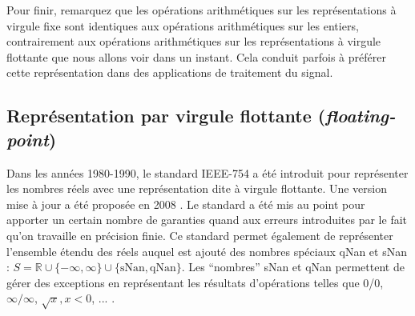 Pour finir, remarquez que les opérations arithmétiques sur les représentations à virgule fixe sont identiques aux opérations arithmétiques sur les entiers, contrairement aux opérations arithmétiques sur les représentations à virgule flottante que nous allons voir dans un instant. Cela conduit parfois à préférer cette représentation dans des applications de traitement du signal.


\subsection{Représentation par virgule flottante (\emph{floating-point})}

Dans les années 1980-1990, le standard IEEE-754 a été introduit pour représenter les nombres réels avec une représentation dite à virgule flottante. Une version mise à jour a été proposée en 2008 \citep{IEEE754}. Le standard a été mis au point pour apporter un certain nombre de garanties quand aux erreurs introduites par le fait qu'on travaille en précision finie. Ce standard permet également de représenter l'ensemble étendu des réels auquel est ajouté des nombres spéciaux qNan et sNan : $S = \mathbb{R} \cup \{-\infty, \infty\} \cup \{\mbox{sNan}, \mbox{qNan}\}$. Les ``nombres'' sNan et qNan permettent de gérer des exceptions en représentant les résultats d'opérations telles que 0/0, $\infty/\infty$, $\sqrt{x}, x < 0$, ... .

